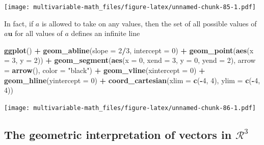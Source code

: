 \documentclass[
]{book}
\newenvironment{Shaded}{\begin{snugshade}}{\end{snugshade}}
\newcommand{\DataTypeTok}[1]{\textcolor[rgb]{0.13,0.29,0.53}{#1}}
\newcommand{\DecValTok}[1]{\textcolor[rgb]{0.00,0.00,0.81}{#1}}
\newcommand{\KeywordTok}[1]{\textcolor[rgb]{0.13,0.29,0.53}{\textbf{#1}}}
\newcommand{\NormalTok}[1]{#1}
\newcommand{\OperatorTok}[1]{\textcolor[rgb]{0.81,0.36,0.00}{\textbf{#1}}}
\newcommand{\StringTok}[1]{\textcolor[rgb]{0.31,0.60,0.02}{#1}}
\theoremstyle{definition}
\theoremstyle{definition}
\theoremstyle{definition}
\theoremstyle{remark}
\begin{document}
\texttt{[image: multivariable-math\_files/figure-latex/unnamed-chunk-85-1.pdf]}

In fact, if \(a\) is allowed to take on any values, then the set of all possible values of \(a \mathbf{u}\) for all values of \(a\) defines an infinite line

\begin{Shaded}
\begin{Highlighting}[]
\KeywordTok{ggplot}\NormalTok{() }\OperatorTok{+}
\StringTok{    }\KeywordTok{geom_abline}\NormalTok{(}\DataTypeTok{slope =} \DecValTok{2}\OperatorTok{/}\DecValTok{3}\NormalTok{, }\DataTypeTok{intercept =} \DecValTok{0}\NormalTok{) }\OperatorTok{+}\StringTok{  }
\StringTok{    }\KeywordTok{geom_point}\NormalTok{(}\KeywordTok{aes}\NormalTok{(}\DataTypeTok{x =} \DecValTok{3}\NormalTok{, }\DataTypeTok{y =} \DecValTok{2}\NormalTok{)) }\OperatorTok{+}
\StringTok{    }\KeywordTok{geom_segment}\NormalTok{(}\KeywordTok{aes}\NormalTok{(}\DataTypeTok{x =} \DecValTok{0}\NormalTok{, }\DataTypeTok{xend =} \DecValTok{3}\NormalTok{, }\DataTypeTok{y =} \DecValTok{0}\NormalTok{, }\DataTypeTok{yend =} \DecValTok{2}\NormalTok{), }\DataTypeTok{arrow =} \KeywordTok{arrow}\NormalTok{(), }\DataTypeTok{color =} \StringTok{"black"}\NormalTok{) }\OperatorTok{+}
\StringTok{    }\KeywordTok{geom_vline}\NormalTok{(}\DataTypeTok{xintercept =} \DecValTok{0}\NormalTok{) }\OperatorTok{+}\StringTok{ }
\StringTok{    }\KeywordTok{geom_hline}\NormalTok{(}\DataTypeTok{yintercept =} \DecValTok{0}\NormalTok{) }\OperatorTok{+}
\StringTok{    }\KeywordTok{coord_cartesian}\NormalTok{(}\DataTypeTok{xlim =} \KeywordTok{c}\NormalTok{(}\OperatorTok{-}\DecValTok{4}\NormalTok{, }\DecValTok{4}\NormalTok{), }\DataTypeTok{ylim =} \KeywordTok{c}\NormalTok{(}\OperatorTok{-}\DecValTok{4}\NormalTok{, }\DecValTok{4}\NormalTok{)) }
\end{Highlighting}
\end{Shaded}

\texttt{[image: multivariable-math\_files/figure-latex/unnamed-chunk-86-1.pdf]}

\hypertarget{the-geometric-interpretation-of-vectors-in-mathcalr3}{%
\subsection{\texorpdfstring{The geometric interpretation of vectors in \(\mathcal{R}^3\)}{The geometric interpretation of vectors in \textbackslash mathcal\{R\}\^{}3}}\label{the-geometric-interpretation-of-vectors-in-mathcalr3}}
\end{document}

